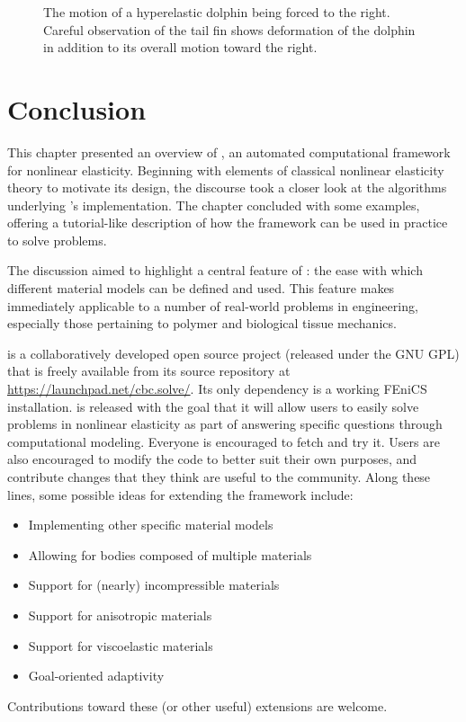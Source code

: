 \begin{figure}
{    }
    \caption{The motion of a hyperelastic dolphin being forced to the
      right. Careful observation of the tail fin shows deformation of
      the dolphin in addition to its overall motion toward the right.}
  \label{fig:narayanan:tumblingdolphin}
\end{figure}

\section{Conclusion}

This chapter presented an overview of \twist, an automated
computational framework for nonlinear elasticity. Beginning with
elements of classical nonlinear elasticity theory to motivate its
design, the discourse took a closer look at the algorithms underlying
\twist's implementation. The chapter concluded with some examples,
offering a tutorial-like description of how the framework can be used
in practice to solve problems.

The discussion aimed to highlight a central feature of \twist: the
ease with which different material models can be defined and
used. This feature makes \twist{} immediately applicable to a number
of real-world problems in engineering, especially those pertaining to
polymer and biological tissue mechanics.

\twist{} is a collaboratively developed open source project (released
under the GNU GPL) that is freely available from its source repository
at \url{https://launchpad.net/cbc.solve/}. Its only dependency is a
working FEniCS installation. \twist{} is released with the goal that
it will allow users to easily solve problems in nonlinear elasticity
as part of answering specific questions through computational
modeling. Everyone is encouraged to fetch and try it. Users are also
encouraged to modify the code to better suit their own purposes, and
contribute changes that they think are useful to the community. Along
these lines, some possible ideas for extending the framework include:
\begin{itemize}
\item Implementing other specific material models
\item Allowing for bodies composed of multiple materials
\item Support for (nearly) incompressible materials
\item Support for anisotropic materials
\item Support for viscoelastic materials
\item Goal-oriented adaptivity
\end{itemize}
Contributions toward these (or other useful) extensions are
welcome.
